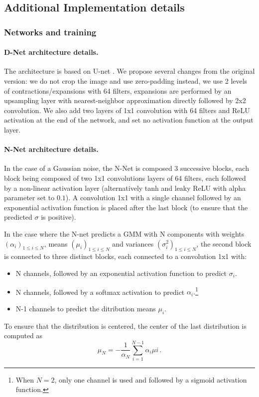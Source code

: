 \documentclass{article}
\begin{document}
\subsection{Additional Implementation details}
\label{si:implementation}
\subsubsection{Networks and training}
\paragraph{D-Net architecture details.}
The architecture is based on U-net \cite{ronneberger2015u}.
We propose several changes from the original version: we do not crop the image and use zero-padding instead, we use 2 levels of contractions/expansions with 64 filters, expansions are performed by an upsampling layer with nearest-neighbor approximation directly followed by 2x2 convolution. We also add two layers of 1x1 convolution with 64 filters and ReLU activation at the end of the network, and set no activation function at the output layer.

\paragraph{N-Net architecture details.}
In the case of a Gaussian noise, the N-Net is composed 3 successive blocks, each block being composed of two 1x1 convolutions layers of 64 filters, each followed by a non-linear activation layer (alternatively tanh and leaky ReLU with alpha parameter set to $0.1$). A convolution 1x1 with a single channel followed by an exponential activation function is placed after the last block (to ensure that the predicted $\sigma$ is positive).

In the case where the N-net predicts a GMM with N components with weights $(\alpha_i)_{1\leqslant i\leqslant N}$, means $(\mu_i)_{1\leqslant i\leqslant N}$ and variances $(\sigma^2_i)_{1\leqslant i\leqslant N}$, the second block is connected to three distinct blocks, each connected to a convolution 1x1 with:
\begin{itemize}
  \item N channels, followed by an exponential activation function to predict $\sigma_{i}$.
  \item N channels, followed by a softmax activation to predict $\alpha_{i}.$\footnote{When $N=2$, only one channel is used and followed by a sigmoid activation function.}
  \item N-1 channels to predict the ditribution means $\mu_{i}$.
\end{itemize}
To ensure that the distribution is centered, the center of the last distribution is computed as
$$
\mu_{N} = - \frac{1}{\alpha_{N}} \sum_{i=1}^{N-1}{\alpha_{i} \mu{i}}\,.
$$
\end{document}
